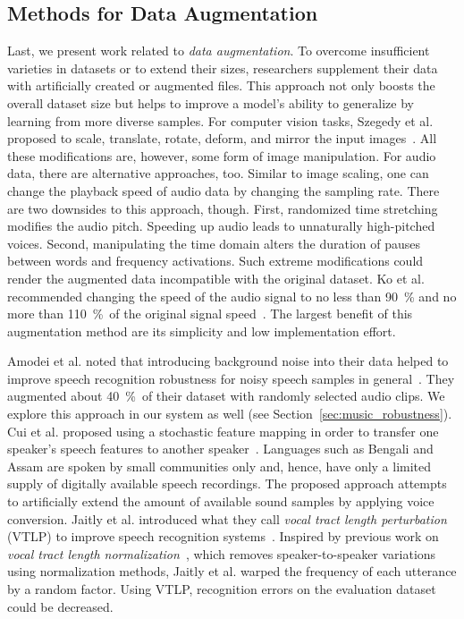 \subsection{Methods for Data Augmentation}
Last, we present work related to \emph{data augmentation}. To overcome insufficient varieties in datasets or to extend their sizes, researchers supplement their data with artificially created or augmented files. This approach not only boosts the overall dataset size but helps to improve a model's ability to generalize by learning from more diverse samples. For computer vision tasks, Szegedy et al. proposed to scale, translate, rotate, deform, and mirror the input images~\cite{szegedy2015going}. All these modifications are, however, some form of image manipulation. For audio data, there are alternative approaches, too. Similar to image scaling, one can change the playback speed of audio data by changing the sampling rate. There are two downsides to this approach, though. First, randomized time stretching modifies the audio pitch. Speeding up audio leads to unnaturally high-pitched voices. Second, manipulating the time domain alters the duration of pauses between words and frequency activations. Such extreme modifications could render the augmented data incompatible with the original dataset. Ko et al. recommended changing the speed of the audio signal to no less than \SI{90}{\percent} and no more than \SI{110}{\percent}~of the original signal speed~\cite{ko2015audio}. The largest benefit of this augmentation method are its simplicity and low implementation effort.

Amodei et al. noted that introducing background noise into their data helped to improve speech recognition robustness for noisy speech samples in general~\cite{amodei2015deep}. They augmented about \SI{40}{\percent}~of their dataset with randomly selected audio clips. We explore this approach in our system as well (see Section~\ref{sec:music_robustness}). Cui et al. proposed using a stochastic feature mapping in order to transfer one speaker's speech features to another speaker~\cite{cui2015data}. Languages such as Bengali and Assam are spoken by small communities only and, hence, have only a limited supply of digitally available speech recordings. The proposed approach attempts to artificially extend the amount of available sound samples by applying voice conversion.
Jaitly et al. introduced what they call \emph{vocal tract length perturbation} (VTLP) to improve speech recognition systems~\cite{jaitly2013vocal}. Inspired by previous work on \emph{vocal tract length normalization}~\cite{eide1996parametric}, which removes speaker-to-speaker variations using normalization methods, Jaitly et al. warped the frequency of each utterance by a random factor. Using VTLP, recognition errors on the evaluation dataset could be decreased.
